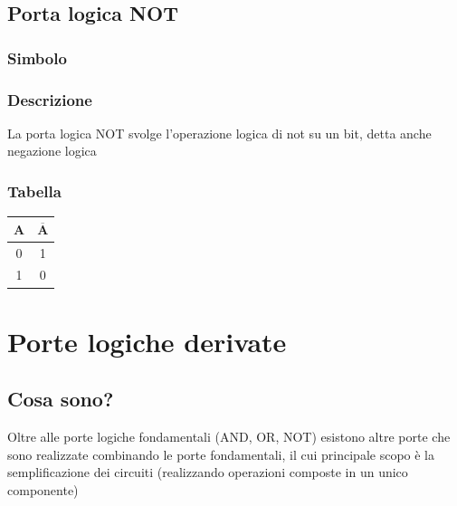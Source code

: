 \subsection{Porta logica NOT}
\begin{minipage}[t]{0.31\textwidth}
    \subsubsection{Simbolo}
\end{minipage}
\hfil
\begin{minipage}[t]{0.31\textwidth}
    \subsubsection{Descrizione}
    La porta logica NOT svolge l'operazione logica di not su un bit, detta anche negazione logica
\end{minipage}
\hfil
\begin{minipage}[t]{0.31\textwidth}
    \subsubsection{Tabella}
    \begin{tabular}{|c|c|}
        \hline
        $\mathbf{A}$ & $\mathbf{\overline{A}}$ \\ \hline
        0 & 1 \\ \hline
        1 & 0 \\ \hline
    \end{tabular}
\end{minipage}

\section{Porte logiche derivate}
\subsection{Cosa sono?}
Oltre alle porte logiche fondamentali (AND, OR, NOT) esistono altre porte che sono realizzate combinando le porte fondamentali, il cui principale scopo è la semplificazione dei circuiti (realizzando operazioni composte in un unico componente)

